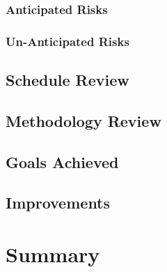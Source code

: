 \documentclass[11pt,a4paper]{report}
\begin{document}
\subsection{Anticipated Risks}
\label{sec:anticipated-risks}
\subsection{Un-Anticipated Risks}
\label{sec:unanticipated-risks}
\section{Schedule Review}
\label{sec:schedule-review}
\section{Methodology Review}
\label{sec:methodology-review}
\section{Goals Achieved}
\label{sec:goals-achieved}
\section{Improvements}
\label{sec:improvements}

\chapter*{Summary}
\label{sec:summary}

\newpage



\appendix
\end{document}
